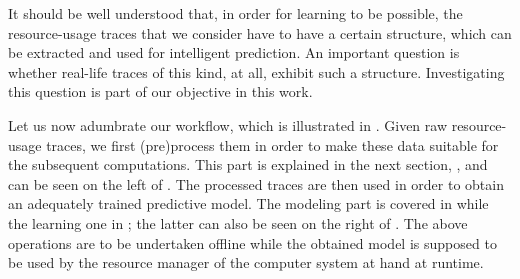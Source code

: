 It should be well understood that, in order for learning to be possible, the
resource-usage traces that we consider have to have a certain structure, which
can be extracted and used for intelligent prediction. An important question is
whether real-life traces of this kind, at all, exhibit such a structure.
Investigating this question is part of our objective in this work.

Let us now adumbrate our workflow, which is illustrated in .
Given raw resource-usage traces, we first (pre)process them in order to make
these data suitable for the subsequent computations. This part is explained in
the next section, , and can be seen on the left of .
The processed traces are then used in order to obtain an adequately trained
predictive model. The modeling part is covered in  while the
learning one in ; the latter can also be seen on the right of
. The above operations are to be undertaken offline while the
obtained model is supposed to be used by the resource manager of the computer
system at hand at runtime.
